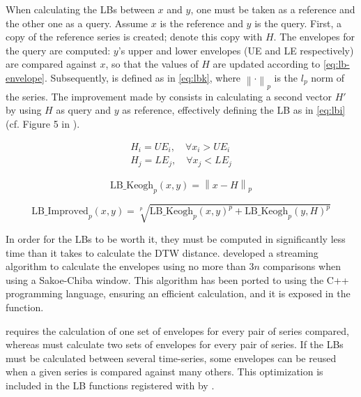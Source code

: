 When calculating the LBs between $x$ and $y$,
one must be taken as a reference and the other one as a query.
Assume $x$ is the reference and $y$ is the query.
First, a copy of the reference series is created;
denote this copy with $H$.
The envelopes for the query are computed:
$y$'s upper and lower envelopes (UE and LE respectively) are compared against $x$,
so that the values of $H$ are updated according to \cref{eq:lb-envelope}.
Subsequently,  is defined as in \cref{eq:lbk},
where $\left\lVert \cdot \right\rVert_p$ is the $l_p$ norm of the series.
The improvement made by  consists in calculating a second vector $H'$ by using $H$ as query and $y$ as reference,
effectively defining the LB as in \cref{eq:lbi} (cf. Figure 5 in \citet{lemire2009}).

\begin{subequations}
\label{eq:lb-envelope}
\begin{gather}
H_i = UE_i, \quad \forall x_i > UE_i \\
H_j = LE_j, \quad \forall x_j < LE_j
\end{gather}
\end{subequations}

\begin{equation}
\label{eq:lbk}
\text{LB\_Keogh}_p(x,y) = \left\lVert x - H \right\rVert_p
\end{equation}

\begin{equation}
\label{eq:lbi}
\text{LB\_Improved}_p(x,y) = \sqrt[p]{\text{LB\_Keogh}_p(x,y)^p + \text{LB\_Keogh}_p(y,H)^p}
\end{equation}

In order for the LBs to be worth it,
they must be computed in significantly less time than it takes to calculate the DTW distance.
\citet{lemire2009} developed a streaming algorithm to calculate the envelopes using no more than $3n$ comparisons when using a Sakoe-Chiba window.
This algorithm has been ported to \dtwclust{} using the C++ programming language,
ensuring an efficient calculation,
and it is exposed in the  function.

 requires the calculation of one set of envelopes for every pair of series compared,
whereas  must calculate two sets of envelopes for every pair of series.
If the LBs must be calculated between several time-series,
some envelopes can be reused when a given series is compared against many others.
This optimization is included in the LB functions registered with  by \dtwclust{}.

